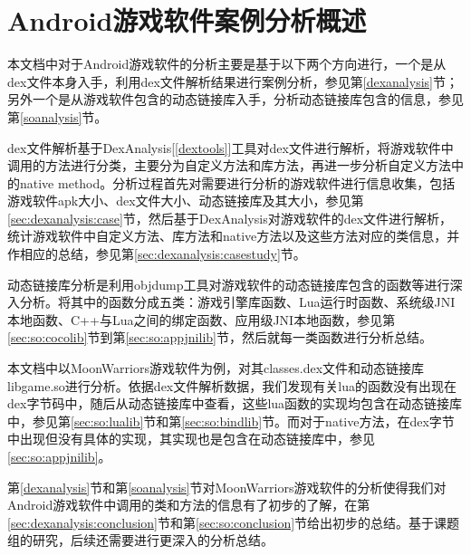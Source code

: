 \section{Android游戏软件案例分析概述}
本文档中对于Android游戏软件的分析主要是基于以下两个方向进行，一个是从dex文件本身入手，利用dex文件解析结果进行案例分析，参见第\ref{dexanalysis}节；另外一个是从游戏软件包含的动态链接库入手，分析动态链接库包含的信息，参见第\ref{soanalysis}节。

dex文件解析基于DexAnalysis[\ref{dextools}]工具对dex文件进行解析，将游戏软件中调用的方法进行分类，主要分为自定义方法和库方法，再进一步分析自定义方法中的native method。分析过程首先对需要进行分析的游戏软件进行信息收集，包括游戏软件apk大小、dex文件大小、动态链接库及其大小，参见第\ref{sec:dexanalysis:case}节，然后基于DexAnalysis对游戏软件的dex文件进行解析，统计游戏软件中自定义方法、库方法和native方法以及这些方法对应的类信息，并作相应的总结，参见第\ref{sec:dexanalysis:casestudy}节。

动态链接库分析是利用objdump工具对游戏软件的动态链接库包含的函数等进行深入分析。将其中的函数分成五类：游戏引擎库函数、Lua运行时函数、系统级JNI本地函数、C++与Lua之间的绑定函数、应用级JNI本地函数，参见第\ref{sec:so:cocolib}节到第\ref{sec:so:appjnilib}节，然后就每一类函数进行分析总结。

本文档中以MoonWarriors游戏软件为例，对其classes.dex文件和动态链接库libgame.so进行分析。依据dex文件解析数据，我们发现有关lua的函数没有出现在dex字节码中，随后从动态链接库中查看，这些lua函数的实现均包含在动态链接库中，参见第\ref{sec:so:lualib}节和第\ref{sec:so:bindlib}节。而对于native方法，在dex字节中出现但没有具体的实现，其实现也是包含在动态链接库中，参见\ref{sec:so:appjnilib}。

第\ref{dexanalysis}节和第\ref{soanalysis}节对MoonWarriors游戏软件的分析使得我们对Android游戏软件中调用的类和方法的信息有了初步的了解，在第\ref{sec:dexanalysis:conclusion}节和第\ref{sec:so:conclusion}节给出初步的总结。基于课题组的研究，后续还需要进行更深入的分析总结。


